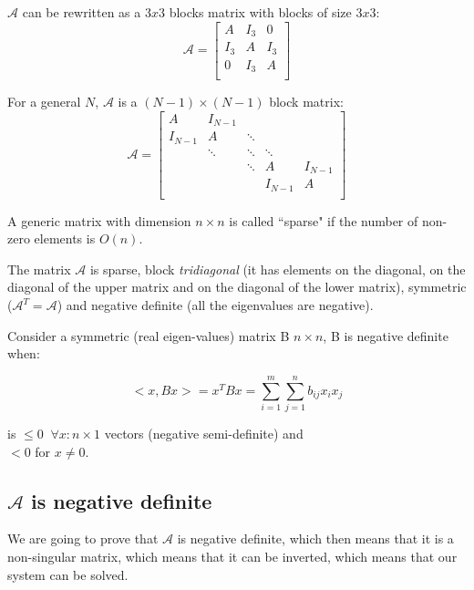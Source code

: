 $\mathcal{A}$ can be rewritten as a $3x3$ blocks matrix with blocks of size $3x3$:
\begin{equation*}
\mathcal{A} = \begin{bmatrix}
  A & I_3 &   0 \\
I_3 &   A & I_3 \\
  0 & I_3 &   A \\
\end{bmatrix}
\end{equation*}


For a general $N$, $\mathcal{A}$ is a $(N - 1) \times (N - 1)$ block matrix:
\begin{equation*}
\mathcal{A} = \begin{bmatrix}
      A & I_{N-1} &        &         &         \\
I_{N-1} &       A & \ddots &         &         \\
        &  \ddots & \ddots &  \ddots &         \\
%
        &         & \ddots &       A & I_{N-1} \\
        &         &        & I_{N-1} &       A \\
\end{bmatrix}
\end{equation*}



A generic matrix with dimension $n \times n$ is called ``sparse" if the number of non-zero elements is $O(n)$.

The matrix $\mathcal{A}$ is sparse, block \textit{tridiagonal} (it has elements on the diagonal, on the diagonal of the upper matrix and on the diagonal of the lower matrix), symmetric ($\mathcal{A}^T = \mathcal{A}$) and negative definite (all the eigenvalues are negative).

Consider a symmetric (real eigen-values) matrix B $n \times n$, B is negative definite when:

\begin{equation*}
<x, Bx> = x^T B x = \sum_{i=1}^{m} \sum_{j=1}^{n} b_{ij} x_i x_j
\end{equation*}

is $ \le 0 \;\; \forall x: n \times 1$ vectors (negative semi-definite) and\\
$< 0$ for $x \ne 0$.

\subsection{$\mathcal{A}$ is negative definite}
We are going to prove that $\mathcal{A}$ is negative definite, which then means that it is a non-singular matrix, which means that it can be inverted, which means that our system can be solved.

